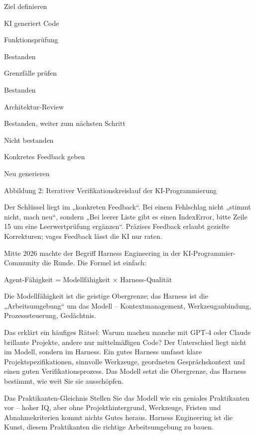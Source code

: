 Ziel definieren

KI generiert Code

Funktionsprüfung

Bestanden

Grenzfälle prüfen

Bestanden

Architektur-Review

Bestanden, weiter zum nächsten Schritt

Nicht bestanden

Konkretes Feedback geben

Neu generieren

\begin{center}\small\color{gray}Abbildung 2: Iterativer Verifikationskreislauf der KI-Programmierung\end{center}

Der Schlüssel liegt im „konkreten Feedback“. Bei einem Fehlschlag nicht „stimmt nicht, mach neu“, sondern „Bei leerer Liste gibt es einen IndexError, bitte Zeile 15 um eine Leerwertprüfung ergänzen“. Präzises Feedback erlaubt gezielte Korrekturen; vages Feedback lässt die KI nur raten.


Mitte 2026 machte der Begriff Harness Engineering in der KI-Programmier-Community die Runde. Die Formel ist einfach:

Agent-Fähigkeit = Modellfähigkeit × Harness-Qualität

Die Modellfähigkeit ist die geistige Obergrenze; das Harness ist die „Arbeitsumgebung“ um das Modell – Kontextmanagement, Werkzeuganbindung, Prozesssteuerung, Gedächtnis.

Das erklärt ein häufiges Rätsel: Warum machen manche mit GPT-4 oder Claude brillante Projekte, andere nur mittelmäßigen Code? Der Unterschied liegt nicht im Modell, sondern im Harness. Ein gutes Harness umfasst klare Projektspezifikationen, sinnvolle Werkzeuge, geordneten Gesprächskontext und einen guten Verifikationsprozess. Das Modell setzt die Obergrenze, das Harness bestimmt, wie weit Sie sie ausschöpfen.

\begin{tcbinfo}{Das Praktikanten-Gleichnis}
Stellen Sie das Modell wie ein geniales Praktikanten vor – hoher IQ, aber ohne Projekthintergrund, Werkzeuge, Fristen und Abnahmekriterien kommt nichts Gutes heraus. Harness Engineering ist die Kunst, diesem Praktikanten die richtige Arbeitsumgebung zu bauen.

\end{tcbinfo}

